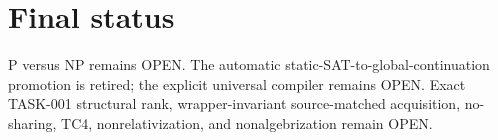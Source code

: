 \documentclass[11pt]{article}
\begin{document}
\section*{Final status}
P versus NP remains OPEN. The automatic static-SAT-to-global-continuation promotion is retired; the explicit universal compiler remains OPEN. Exact TASK-001 structural rank, wrapper-invariant source-matched acquisition, no-sharing, TC4, nonrelativization, and nonalgebrization remain OPEN.

\end{document}
